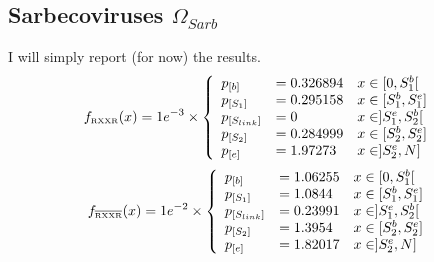 \documentclass[pdflatex,sn-basic,iicol]{sn-jnl}%
\begin{document}
\subsection{Sarbecoviruses $\Omega_{Sarb}$}
I will simply report (for now) the results.
\[
    f_{\scriptscriptstyle{\text{RXXR}}}(x) = 1e^{-3} \times \left \{  
        \begin{array}{l l l}
            p_{[b]}         & = 0.326894    & x \in [0, S_1^{b}[        \\
            p_{[S_1]}       & = 0.295158    & x \in [S_1^{b}, S_1^{e}]  \\
            p_{[S_{link}]}  & = 0           & x \in ]S_1^{e}, S_2^{b}[  \\
            p_{[S_2]}       & = 0.284999    & x \in [S_2^{b}, S_2^{e}]   \\
            p_{[e]}         & = 1.97273     & x \in ]S_2^{e}, N]
        \end{array}   \right . 
\]
\[
    f_{\scriptscriptstyle{\overline{\text{RXXR}}}}(x) = 1e^{-2} \times \left \{  
        \begin{array}{l l l}
            p_{[b]}         & = 1.06255     & x \in [0, S_1^{b}[        \\
            p_{[S_1]}       & = 1.0844      & x \in [S_1^{b}, S_1^{e}]  \\
            p_{[S_{link}]}  & = 0.23991     & x \in ]S_1^{e}, S_2^{b}[  \\
            p_{[S_2]}       & = 1.3954      & x \in [S_2^{b}, S_2^{e}]   \\
            p_{[e]}         & = 1.82017     & x \in ]S_2^{e}, N]
        \end{array}   \right . 
\]


\end{document}
